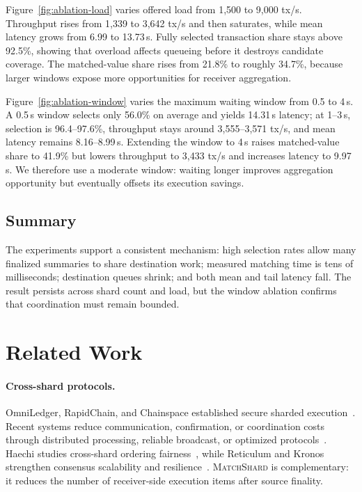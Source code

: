 \documentclass[sigconf,anonymous,review]{acmart}
\newcommand{\system}{\textsc{MatchShard}\xspace}
\begin{document}
Figure~\ref{fig:ablation-load} varies offered load from 1,500 to 9,000 tx/s. Throughput rises from 1,339 to 3,642 tx/s and then saturates, while mean latency grows from 6.99 to 13.73\,s. Fully selected transaction share stays above 92.5\%, showing that overload affects queueing before it destroys candidate coverage. The matched-value share rises from 21.8\% to roughly 34.7\%, because larger windows expose more opportunities for receiver aggregation.

Figure~\ref{fig:ablation-window} varies the maximum waiting window from 0.5 to 4\,s. A 0.5\,s window selects only 56.0\% on average and yields 14.31\,s latency; at 1--3\,s, selection is 96.4--97.6\%, throughput stays around 3,555--3,571 tx/s, and mean latency remains 8.16--8.99\,s. Extending the window to 4\,s raises matched-value share to 41.9\% but lowers throughput to 3,433 tx/s and increases latency to 9.97\,s. We therefore use a moderate window: waiting longer improves aggregation opportunity but eventually offsets its execution savings.

\subsection{Summary}

The experiments support a consistent mechanism: high selection rates allow many finalized summaries to share destination work; measured matching time is tens of milliseconds; destination queues shrink; and both mean and tail latency fall. The result persists across shard count and load, but the window ablation confirms that coordination must remain bounded.

\section{Related Work}

\paragraph{Cross-shard protocols.}
OmniLedger, RapidChain, and Chainspace established secure sharded execution~\cite{omniledger2018,rapidchain2018,chainspace2018}. Recent systems reduce communication, confirmation, or coordination costs through distributed processing, reliable broadcast, or optimized protocols~\cite{dcchain2024,estuary2024,presto2024,lightcross2024,logos2026,xrbc2026}. Haechi studies cross-shard ordering fairness~\cite{haechi2024}, while Reticulum and Kronos strengthen consensus scalability and resilience~\cite{reticulum2024,kronos2025}. \system is complementary: it reduces the number of receiver-side execution items after source finality.
\end{document}
